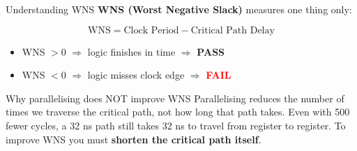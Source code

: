 \documentclass[aspectratio=169, 11pt]{beamer}
\begin{document}
\begin{frame}{Understanding WNS}
\textbf{WNS (Worst Negative Slack)} measures one thing only:

\vspace{0.3em}
\begin{center}
\end{center}

\vspace{0.3em}
\[
  \text{WNS} = \text{Clock Period} - \text{Critical Path Delay}
\]

\begin{itemize}
  \item WNS $> 0$ $\Rightarrow$ logic finishes in time $\Rightarrow$ \textcolor{green!60!black}{\textbf{PASS}}
  \item WNS $< 0$ $\Rightarrow$ logic misses clock edge $\Rightarrow$ \textcolor{red}{\textbf{FAIL}}
\end{itemize}

\vspace{0.3em}
\begin{alertblock}{Why parallelising does NOT improve WNS}
Parallelising reduces the number of times we traverse the critical path, not how long that path takes. Even with 500 fewer cycles, a 32 ns path still takes 32 ns to travel from register to register.
To improve WNS you must \textbf{shorten the critical path itself}.
\end{alertblock}
\end{frame}
\end{document}
